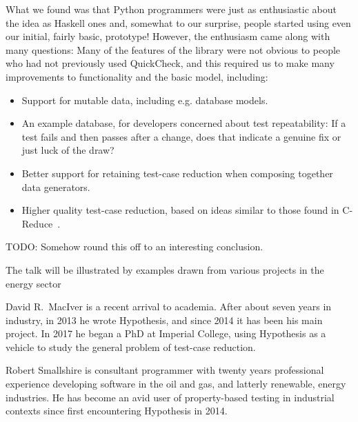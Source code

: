 \documentclass[10pt,conference]{IEEEtran}
\begin{document}
What we found was that Python programmers were just as enthusiastic about the idea as Haskell ones and, somewhat to our surprise, people started using even our initial, fairly basic, prototype!
However, the enthusiasm came along with many questions: Many of the features of the library were not obvious to people who had not previously used QuickCheck,
and this required us to make many improvements to functionality and the basic model, including:

\begin{itemize}
\item Support for mutable data, including e.g. database models.
\item An example database, for developers concerned about test repeatability: If a test fails and then passes after a change, does that indicate a genuine fix or just luck of the draw?
\item Better support for retaining test-case reduction when composing together data generators.
\item Higher quality test-case reduction, based on ideas similar to those found in C-Reduce~\cite{DBLP:conf/pldi/RegehrCCEEY12}.
\end{itemize}

TODO: Somehow round this off to an interesting conclusion.

The talk will be illustrated by examples drawn from various projects in the energy sector

\begin{IEEEbiographynophoto}{David R.~MacIver} is a recent arrival to academia. After about seven years in industry, in 2013 he wrote Hypothesis, and since 2014 it has been his main project.
In 2017 he began a PhD at Imperial College, using Hypothesis as a vehicle to study the general problem of test-case reduction.
\end{IEEEbiographynophoto}
\begin{IEEEbiographynophoto}{Robert Smallshire} is consultant programmer with twenty years professional experience developing software in the oil and gas, and latterly renewable, energy industries. He has become an avid user of property-based testing in industrial contexts since first encountering Hypothesis in 2014.
\end{IEEEbiographynophoto}



\end{document}
